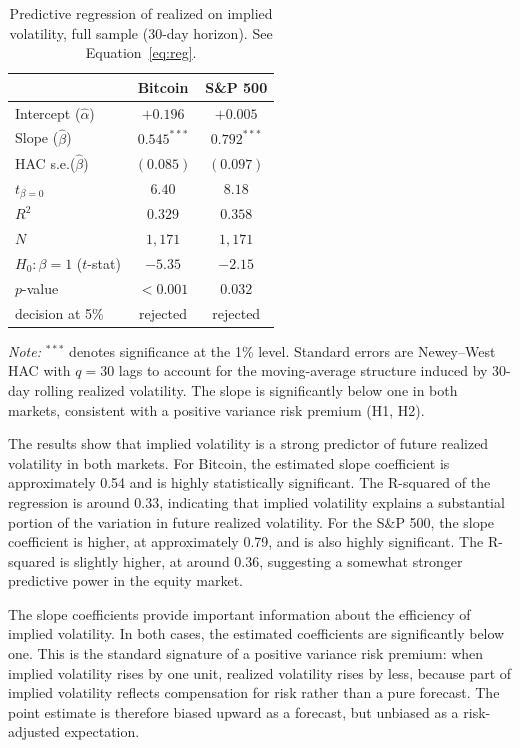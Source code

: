 \documentclass[11pt,a4paper,openany]{report}
\begin{document}
\begin{table}[H]
\centering
\caption{Predictive regression of realized on implied volatility, full sample (30-day horizon). See Equation~\eqref{eq:reg}.}
\label{tab:reg_global}
\begin{tabular}{lcc}
\toprule
& Bitcoin & S\&P 500 \\
\midrule
Intercept ($\hat{\alpha}$)               & $+0.196$ & $+0.005$ \\
Slope ($\hat{\beta}$)                    & $0.545^{***}$ & $0.792^{***}$ \\
HAC s.e.($\hat{\beta}$)                  & $(0.085)$ & $(0.097)$ \\
$t_{\beta=0}$                            & $6.40$ & $8.18$ \\
$R^{2}$                                  & $0.329$ & $0.358$ \\
$N$                                      & $1{,}171$ & $1{,}171$ \\
\midrule
$H_0: \beta = 1$ ($t$-stat)              & $-5.35$ & $-2.15$ \\
\quad $p$-value                          & $<0.001$ & $0.032$ \\
\quad decision at 5\%                    & rejected & rejected \\
\bottomrule
\end{tabular}
\begin{flushleft}\small
\textit{Note:} $^{***}$ denotes significance at the 1\% level. Standard errors are Newey--West HAC with $q=30$ lags to account for the moving-average structure induced by 30-day rolling realized volatility. The slope is significantly below one in both markets, consistent with a positive variance risk premium (H1, H2).
\end{flushleft}
\end{table}

The results show that implied volatility is a strong predictor of future
realized volatility in both markets. For Bitcoin, the estimated slope
coefficient is approximately 0.54 and is highly statistically
significant. The R-squared of the regression is around 0.33, indicating
that implied volatility explains a substantial portion of the variation
in future realized volatility. For the S\&P 500, the slope coefficient
is higher, at approximately 0.79, and is also highly significant. The
R-squared is slightly higher, at around 0.36, suggesting a somewhat
stronger predictive power in the equity market.

The slope coefficients provide important information about the
efficiency of implied volatility. In both cases, the estimated
coefficients are significantly below one. This is the standard
signature of a positive variance risk premium: when implied volatility
rises by one unit, realized volatility rises by less, because part of
implied volatility reflects compensation for risk rather than a pure
forecast. The point estimate is therefore biased upward as a forecast,
but unbiased as a risk-adjusted expectation.
\end{document}
